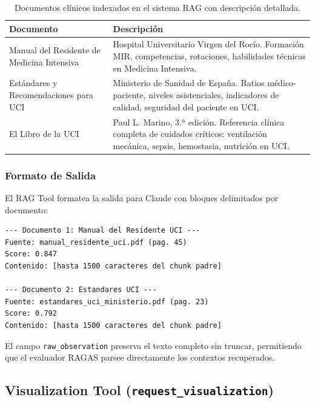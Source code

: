 \begin{table}[H]
\centering
\caption{Documentos clínicos indexados en el sistema \acs{RAG} con descripción detallada.}
\label{tab:appendix_ragdocs}
\footnotesize
\begin{tabularx}{\columnwidth}{lX}
\toprule
\textbf{Documento} & \textbf{Descripción} \\
\midrule
Manual del Residente de Medicina Intensiva & Hospital Universitario Virgen del Rocío. Formación MIR, competencias, rotaciones, habilidades técnicas en Medicina Intensiva. \\
\addlinespace
Estándares y Recomendaciones para \ac{UCI} & Ministerio de Sanidad de España. Ratios médico-paciente, niveles asistenciales, indicadores de calidad, seguridad del paciente en \ac{UCI}. \\
\addlinespace
El Libro de la \ac{UCI} & Paul L. Marino, 3.ª edición. Referencia clínica completa de cuidados críticos: ventilación mecánica, sepsis, hemostasia, nutrición en \ac{UCI}. \\
\bottomrule
\end{tabularx}
\end{table}

\subsubsection{Formato de Salida}

El \ac{RAG} Tool formatea la salida para Claude con bloques delimitados por documento:

\begin{lstlisting}[basicstyle=\tiny\ttfamily, backgroundcolor=\color{codebg}]
--- Documento 1: Manual del Residente UCI ---
Fuente: manual_residente_uci.pdf (pag. 45)
Score: 0.847
Contenido: [hasta 1500 caracteres del chunk padre]

--- Documento 2: Estandares UCI ---
Fuente: estandares_uci_ministerio.pdf (pag. 23)
Score: 0.792
Contenido: [hasta 1500 caracteres del chunk padre]
\end{lstlisting}

El campo \texttt{raw\_observation} preserva el texto completo sin truncar, permitiendo que el evaluador \ac{RAGAS} parsee directamente los contextos recuperados.

\subsection{Visualization Tool (\texttt{request\_visualization})}
\label{sec:appendix_viztool}

